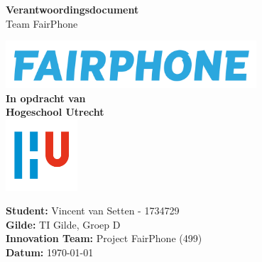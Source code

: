 \documentclass[a4paper]{report}
\begin{document}
\begin{titlepage}
  \begin{center}
      \vspace*{.9cm}
      \Huge
      \textbf{ Verantwoordingsdocument }\\
      \vspace{0.2cm}
      \small Team FairPhone

      \normalsize


      \vspace{2cm}
      \includegraphics[width=0.7\textwidth]{Images/fairphone.png}
      \vspace{2cm}
      \Large\\
      \textbf{In opdracht van}\\
      \large
      \textbf{Hogeschool Utrecht} \\
      \includegraphics[width=0.2\textwidth]{Images/logouni.png}


      \vfill
    \end{center}
      \textbf{Student:} Vincent van Setten - 1734729 \\
      \textbf{Gilde:} TI Gilde, Groep D\\
      \textbf{Innovation Team:} Project FairPhone (499) \\
      \textbf{Datum:} \today \\
      \vspace{2cm}
\end{titlepage}



\tableofcontents
\end{document}
